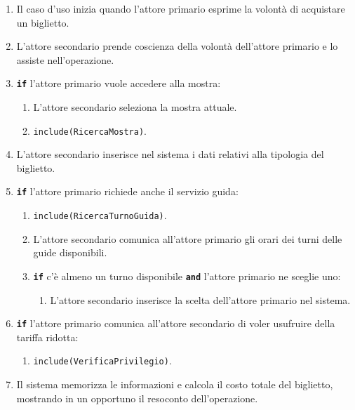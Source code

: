 \documentclass{article}
\begin{document}
		\begin{enumerate}[itemsep=6pt,parsep=0pt]

		\item Il caso d'uso inizia quando l'attore primario esprime la volontà di acquistare un biglietto.

		\item L'attore secondario prende coscienza della volontà dell'attore primario e lo assiste nell'operazione.

		\item \texttt{\textbf{if}} l'attore primario vuole accedere alla mostra:
			\begin{enumerate}	[leftmargin=28pt]
				\item L'attore secondario seleziona la mostra attuale.
				\item \texttt{{include(RicercaMostra)}}.
  			\end{enumerate}	

		\item L'attore secondario inserisce nel sistema i dati relativi alla tipologia del biglietto.

		\item \texttt{\textbf{if}} l'attore primario richiede anche il servizio guida:
			\begin{enumerate}[leftmargin=28pt]
				\item  \texttt{{include(RicercaTurnoGuida)}}.
				\item L'attore secondario comunica all'attore primario gli orari dei turni delle guide disponibili.
				\item \texttt{\textbf{if}} c'è almeno un turno disponibile \texttt{\textbf{and}} l'attore primario ne sceglie uno:
					\begin{enumerate}[leftmargin=34pt]
						\item L'attore secondario inserisce la scelta dell'attore primario nel sistema.
					\end{enumerate}
  			\end{enumerate}	

		\item \texttt{\textbf{if}} l'attore primario comunica all'attore secondario di voler usufruire della tariffa ridotta:
			\begin{enumerate}[leftmargin=34pt]
				\item  \texttt{{include(VerificaPrivilegio)}}.
			\end{enumerate}

		\item Il sistema memorizza le informazioni e calcola il costo totale del biglietto, mostrando in un opportuno il resoconto dell'operazione.


\end{enumerate}
\end{document}
